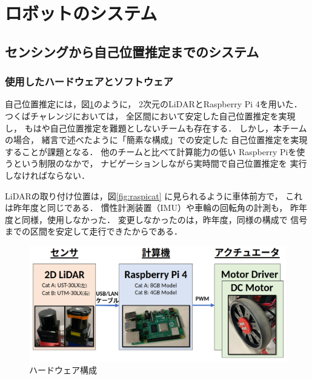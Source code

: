 \documentclass[twocolumn,9pt]{jsproceedings}
\begin{document}
\section{ロボットのシステム}

\subsection{センシングから自己位置推定までのシステム}\label{sub:localization}

\subsubsection{使用したハードウェアとソフトウェア}


自己位置推定には，図\ref{fig:hardware}のように，
2次元のLiDARとRaspberry Pi 4を用いた．
つくばチャレンジにおいては，
全区間において安定した自己位置推定を実現し，
もはや自己位置推定を難題としないチームも存在する．
しかし，本チームの場合，
緒言で述べたように「簡素な構成」での安定した
自己位置推定を実現することが課題となる．
他のチームと比べて計算能力の低い
Raspberry Piを使うという制限のなかで，
ナビゲーションしながら実時間で自己位置推定を
実行しなければならない．


LiDARの取り付け位置は，図\ref{fig:raspicat}
に見られるように車体前方で，
これは昨年度\cite{池邉2021}と同じである．
慣性計測装置（IMU）や車輪の回転角の計測も，
昨年度と同様，使用しなかった．
変更しなかったのは，昨年度，同様の構成で
信号までの区間を安定して走行できたからである．

\begin{figure}[h]
  \begin{center}
    \includegraphics[width=1.0\linewidth]{figs/hardware.pdf}
    \caption{ハードウェア構成}
    \label{fig:hardware}
  \end{center}
\end{figure}
\end{document}
